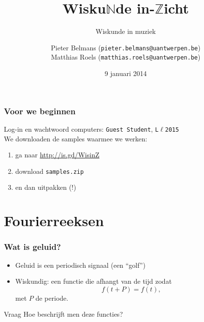 \documentclass[compress, darktitle, framenumber, totalframenumber]{beamer}
\title{Wisku$\mathbb{N}$de in-$\mathbb{Z}$icht}
\subtitle{Wiskunde in muziek}
\author{Pieter Belmans (\texttt{pieter.belmans@uantwerpen.be}) \\ Matthias Roels (\texttt{matthias.roels@uantwerpen.be})}
\date{9 januari 2014}
\begin{document}
\begin{frame}
  \titlepage
\end{frame}

\begin{frame}
  \frametitle{Voor we beginnen}
  Log-in en wachtwoord computers: \texttt{Guest Student}, \texttt{L$\ell$2015}  \\[.2cm] \noindent
  We downloaden de samples waarmee we werken:
  \begin{enumerate}
    \item ga naar \url{http://is.gd/WisinZ}
    \item download \texttt{samples.zip}
    \item en dan uitpakken (!)
  \end{enumerate}
  
\end{frame}

\section{Fourierreeksen}

\begin{frame}
\frametitle{Wat is geluid?}
\begin{itemize}
\item Geluid is een periodisch signaal (een ``golf'') 
\item Wiskundig: een functie die afhangt van de tijd zodat 
\begin{equation*}
f(t+P)=f(t),
\end{equation*}
met $P$ de periode.
\end{itemize}
\begin{block}{Vraag}
Hoe beschrijft men deze functies? 
\end{block}
\end{frame}
\end{document}
